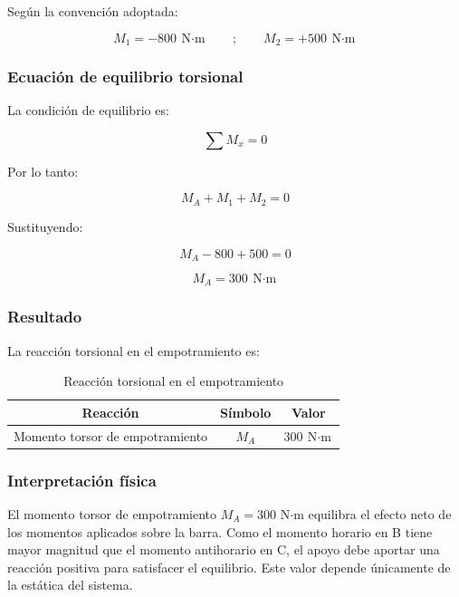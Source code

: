 \documentclass[12pt,a4paper]{article}
\begin{document}
\begin{enumerate}
Según la convención adoptada:

\[
M_1=-800\ \text{N$\cdot$m}
\qquad ; \qquad
M_2=+500\ \text{N$\cdot$m}
\]

\subsubsection*{Ecuación de equilibrio torsional}

La condición de equilibrio es:

\begin{equation}
\sum M_x=0
\end{equation}

Por lo tanto:

\begin{equation}
M_A+M_1+M_2=0
\end{equation}

Sustituyendo:

\begin{equation}
M_A-800+500=0
\end{equation}

\begin{equation}
\boxed{M_A=300\ \text{N$\cdot$m}}
\end{equation}

\subsubsection*{Resultado}

La reacción torsional en el empotramiento es:

\begin{table}[H]
\centering
\begin{tabular}{|c|c|c|}
\hline
\textbf{Reacción} & \textbf{Símbolo} & \textbf{Valor} \\
\hline
Momento torsor de empotramiento & $M_A$ & $300\ \text{N$\cdot$m}$ \\
\hline
\end{tabular}
\caption{Reacción torsional en el empotramiento}
\label{tab:reacciones}
\end{table}
    
   \subsubsection*{Interpretación física}

El momento torsor de empotramiento $M_A = 300$ N$\cdot$m equilibra el efecto neto de los momentos aplicados sobre la barra. Como el momento horario en B tiene mayor magnitud que el momento antihorario en C, el apoyo debe aportar una reacción positiva para satisfacer el equilibrio. Este valor depende únicamente de la estática del sistema.


\end{enumerate}
\end{document}
